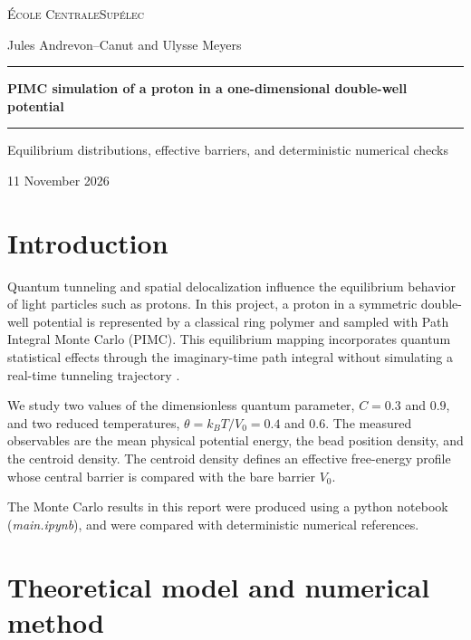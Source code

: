 \documentclass[11pt,a4paper]{report}
\begin{document}
\hypersetup{pageanchor=false}
\begin{titlepage}
\centering
\vspace*{1.5cm}
{\Large \textsc{\'Ecole CentraleSup\'elec}\par}
\vspace{1.5cm}
{\Large Jules Andrevon--Canut and Ulysse Meyers\par}
\vspace{2cm}
\rule{\textwidth}{0.6pt}\par
\vspace{0.5cm}
{\huge\bfseries PIMC simulation of a proton in a one-dimensional double-well potential\par}
\vspace{0.5cm}
\rule{\textwidth}{0.6pt}\par
\vspace{1cm}
{\large Equilibrium distributions, effective barriers, and deterministic numerical checks\par}
\vfill
{\large 11 November 2026\par}
\end{titlepage}
\hypersetup{pageanchor=true}
\tableofcontents
\clearpage
{}

\chapter{Introduction}
Quantum tunneling and spatial delocalization influence the equilibrium behavior of light particles such as protons. In this project, a proton in a symmetric double-well potential is represented by a classical ring polymer and sampled with Path Integral Monte Carlo (PIMC). This equilibrium mapping incorporates quantum statistical effects through the imaginary-time path integral without simulating a real-time tunneling trajectory \cite{brief,ceperley}.

We study two values of the dimensionless quantum parameter, $C=0.3$ and $0.9$, and two reduced temperatures, $\theta=k_BT/V_0=0.4$ and $0.6$. The measured observables are the mean physical potential energy, the bead position density, and the centroid density. The centroid density defines an effective free-energy profile whose central barrier is compared with the bare barrier $V_0$.

The Monte Carlo results in this report were produced using a python notebook (\textit{main.ipynb}), and were compared with deterministic numerical references.

\chapter{Theoretical model and numerical method}
\end{document}

